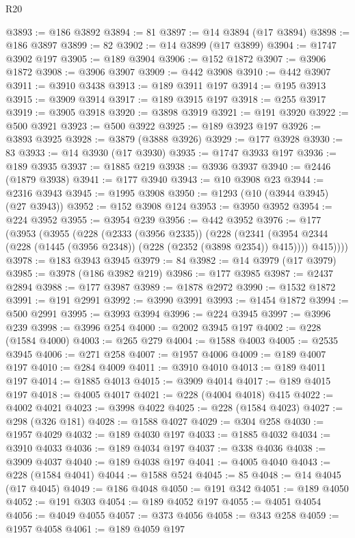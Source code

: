 \begin{lexlean}{R20}
\begin{coremodule}
@3893 := @186 @3892
@3894 := 81
@3897 := @14 @3894 (@17 @3894)
@3898 := @186 @3897
@3899 := 82
@3902 := @14 @3899 (@17 @3899)
@3904 := @1747 @3902 @197
@3905 := @189 @3904
@3906 := @152 @1872
@3907 := @3906 @1872
@3908 := @3906 @3907
@3909 := @442 @3908
@3910 := @442 @3907
@3911 := @3910 @3438
@3913 := @189 @3911 @197
@3914 := @195 @3913
@3915 := @3909 @3914
@3917 := @189 @3915 @197
@3918 := @255 @3917
@3919 := @3905 @3918
@3920 := @3898 @3919
@3921 := @191 @3920
@3922 := @500 @3921
@3923 := @500 @3922
@3925 := @189 @3923 @197
@3926 := @3893 @3925
@3928 := @3879 (@3888 @3926)
@3929 := @177 @3928
@3930 := 83
@3933 := @14 @3930 (@17 @3930)
@3935 := @1747 @3933 @197
@3936 := @189 @3935
@3937 := @1885 @219
@3938 := @3936 @3937
@3940 := @2446 (@1879 @3938)
@3941 := @177 @3940
@3943 := @10 @3908 @23
@3944 := @2316 @3943
@3945 := @1995 @3908
@3950 := @1293 (@10 (@3944 @3945) (@27 @3943))
@3952 := @152 @3908 @124
@3953 := @3950 @3952
@3954 := @224 @3952
@3955 := @3954 @239
@3956 := @442 @3952
@3976 := @177
    (@3953
      (@3955
        (@228
          (@2333 (@3956 @2335))
          (@228
            (@2341 (@3954 @2344 (@228 (@1445 (@3956 @2348)) (@228 (@2352 (@3898 @2354)) @415))))
            @415))))
@3978 := @183 @3943 @3945
@3979 := 84
@3982 := @14 @3979 (@17 @3979)
@3985 := @3978 (@186 @3982 @219)
@3986 := @177 @3985
@3987 := @2437 @2894
@3988 := @177 @3987
@3989 := @1878 @2972
@3990 := @1532 @1872
@3991 := @191 @2991
@3992 := @3990 @3991
@3993 := @1454 @1872
@3994 := @500 @2991
@3995 := @3993 @3994
@3996 := @224 @3945
@3997 := @3996 @239
@3998 := @3996 @254
@4000 := @2002 @3945 @197
@4002 := @228 (@1584 @4000)
@4003 := @265 @279
@4004 := @1588 @4003
@4005 := @2535 @3945
@4006 := @271 @258
@4007 := @1957 @4006
@4009 := @189 @4007 @197
@4010 := @284 @4009
@4011 := @3910 @4010
@4013 := @189 @4011 @197
@4014 := @1885 @4013
@4015 := @3909 @4014
@4017 := @189 @4015 @197
@4018 := @4005 @4017
@4021 := @228 (@4004 @4018) @415
@4022 := @4002 @4021
@4023 := @3998 @4022
@4025 := @228 (@1584 @4023)
@4027 := @298 (@326 @181)
@4028 := @1588 @4027
@4029 := @304 @258
@4030 := @1957 @4029
@4032 := @189 @4030 @197
@4033 := @1885 @4032
@4034 := @3910 @4033
@4036 := @189 @4034 @197
@4037 := @338 @4036
@4038 := @3909 @4037
@4040 := @189 @4038 @197
@4041 := @4005 @4040
@4043 := @228 (@1584 @4041)
@4044 := @1588 @524
@4045 := 85
@4048 := @14 @4045 (@17 @4045)
@4049 := @186 @4048
@4050 := @191 @342
@4051 := @189 @4050
@4052 := @191 @303
@4054 := @189 @4052 @197
@4055 := @4051 @4054
@4056 := @4049 @4055
@4057 := @373 @4056
@4058 := @343 @258
@4059 := @1957 @4058
@4061 := @189 @4059 @197

\end{coremodule}
\end{lexlean}
